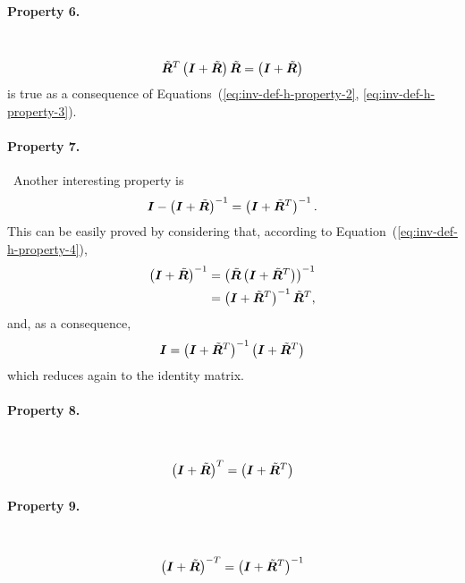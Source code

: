 \documentclass[10pt,fleqn,subeqn]{report}
\newcommand{\T}[1]{\bm{#1}}
\begin{document}
\paragraph{Property 6.} \
\begin{equation}
	\tilde{\T{R}}^T \plbr{\T{I} + \tilde{\T{R}}} \tilde{\T{R}} = \plbr{\T{I} + \tilde{\T{R}}}
	\label{eq:inv-def-h-property-6}
\end{equation}
is true as a consequence
of Equations~(\ref{eq:inv-def-h-property-2}, \ref{eq:inv-def-h-property-3}).

\paragraph{Property 7.} \
Another interesting property is
\begin{equation}
	\T{I} - \plbr{\T{I} + \tilde{\T{R}}}^{-1} = \plbr{\T{I} + \tilde{\T{R}}^T}^{-1} .
	\label{eq:inv-def-h-property-7}
\end{equation}
This can be easily proved by considering that,
according to Equation~(\ref{eq:inv-def-h-property-4}),
\begin{align}
	\plbr{\T{I} + \tilde{\T{R}}}^{-1}
	&= \plbr{\tilde{\T{R}}\plbr{\T{I} + \tilde{\T{R}}^T}}^{-1} \nonumber \\
	&= \plbr{\T{I} + \tilde{\T{R}}^T}^{-1} \tilde{\T{R}}^T ,
\end{align}
and, as a consequence,
\begin{equation}
	\T{I} = \plbr{\T{I} + \tilde{\T{R}}^T}^{-1} \plbr{\T{I} + \tilde{\T{R}}^T}
\end{equation}
which reduces again to the identity matrix.

\paragraph{Property 8.} \
\begin{equation}
	\plbr{\T{I} + \tilde{\T{R}}}^T = \plbr{\T{I} + \tilde{\T{R}}^T}
	\label{eq:inv-def-h-property-8}
\end{equation}

\paragraph{Property 9.} \
\begin{equation}
	\plbr{\T{I} + \tilde{\T{R}}}^{-T} = \plbr{\T{I} + \tilde{\T{R}}^T}^{-1}
	\label{eq:inv-def-h-property-9}
\end{equation}
\end{document}
